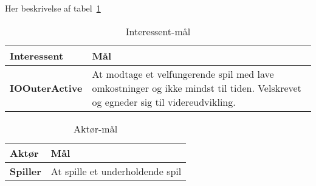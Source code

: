 \documentclass[class=article, crop=false]{standalone}
\begin{document}
    Her beskrivelse af tabel~\ref{tab:interessent}

    \begin{table}[H]
        \caption{Interessent-mål\cite{del3}}\label{tab:interessent}
        \begin{tabularx}{\textwidth}{lX}

            \rowcolor[gray]{.8}
            \textbf{Interessent}& \textbf{Mål}   \\ \hline
            \textbf{IOOuterActive}       & At modtage et velfungerende spil med lave omkostninger og ikke mindst til tiden.
                                            Velskrevet og egneder sig til videreudvikling.  \\


        \end{tabularx}


    \end{table}

    \begin{table}[H]
        \caption{Aktør-mål\cite{del3}}\label{tab:aktoer}
        \begin{tabularx}{\textwidth}{lX}

            \rowcolor[gray]{.8}
            \textbf{Aktør}& \textbf{Mål}   \\ \hline
            \textbf{Spiller}      & At spille et underholdende spil\\ \hline


        \end{tabularx}


    \end{table}
\end{document}
